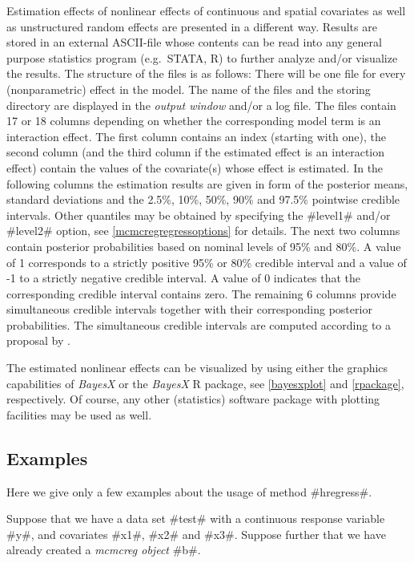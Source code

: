 Estimation effects of
nonlinear effects of continuous and spatial covariates as well as
unstructured random effects are presented in a different way.
Results are stored in an external ASCII-file whose contents can be
read into any general purpose statistics program (e.g.~STATA, R) to further analyze and/or visualize the results. The
structure of the files is as follows: There will be one file for
every (nonparametric) effect in the model. The name of the files and
the storing directory are displayed in the {\em output window}
and/or a log file. The files contain 17 or 18 columns
depending on whether the corresponding model term is an
interaction effect.
The first column contains an index
(starting with one), the second column (and the third column if
the estimated effect is an interaction effect) contain the
values of the covariate(s) whose effect is estimated. In the
following columns the estimation results are given in form of the
posterior means, standard deviations and the 2.5\%, 10\%, 50\%, 90\% and 97.5\%
pointwise credible intervals.
Other quantiles may be obtained by specifying the #level1# and/or
#level2# option, see \autoref{mcmcregregressoptions} for details.
The next  two columns contain posterior probabilities
based on nominal levels of 95\% and 80\%. A value of 1 corresponds
to a strictly positive 95\% or 80\% credible interval and a value
of -1 to a strictly negative credible interval. A value of 0
indicates that the corresponding credible interval contains zero.
The remaining 6 columns provide simultaneous credible intervals together
with their corresponding posterior probabilities. The simultaneous credible intervals
are computed according to a proposal by  .

The estimated nonlinear effects can be visualized by using either
the graphics capabilities of {\em BayesX} or the {\it BayesX} R package, see \autoref{bayesxplot} and \autoref{rpackage},
respectively. Of course, any other (statistics) software package
with plotting facilities may be used as well.

\subsection{Examples}

Here we give only a few examples about the usage of method
#hregress#.

Suppose that we have a data set #test# with a continuous response
variable #y#, and covariates  #x1#, #x2# and #x3#. Suppose further
that we have already created a {\em mcmcreg object} #b#.

